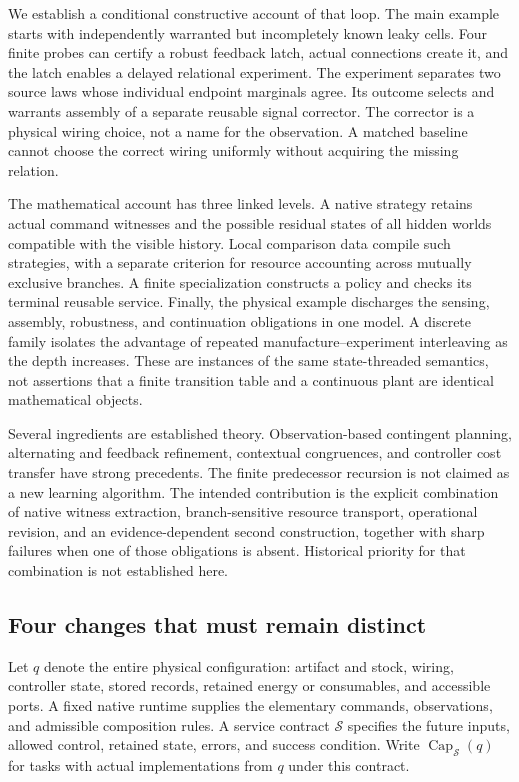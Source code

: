 \documentclass[11pt]{article}
\theoremstyle{definition}
\theoremstyle{remark}
\begin{document}
We establish a conditional constructive account of that loop. The main
example starts with independently warranted but incompletely known leaky
cells. Four finite probes can certify a robust feedback latch, actual
connections create it, and the latch enables a delayed relational
experiment. The experiment separates two source laws whose individual
endpoint marginals agree. Its outcome selects and warrants assembly of a
separate reusable signal corrector. The corrector is a physical wiring
choice, not a name for the observation. A matched baseline cannot choose
the correct wiring uniformly without acquiring the missing relation.

The mathematical account has three linked levels. A native strategy
retains actual command witnesses and the possible residual states of all
hidden worlds compatible with the visible history. Local comparison data
compile such strategies, with a separate criterion for resource
accounting across mutually exclusive branches. A finite specialization
constructs a policy and checks its terminal reusable service. Finally,
the physical example discharges the sensing, assembly, robustness, and
continuation obligations in one model. A discrete family isolates the
advantage of repeated manufacture--experiment interleaving as the depth
increases. These are instances of the same state-threaded semantics,
not assertions that a finite transition table and a continuous plant
are identical mathematical objects.

Several ingredients are established theory. Observation-based contingent
planning, alternating and feedback refinement, contextual congruences,
and controller cost transfer have strong precedents. The finite
predecessor recursion is not claimed as a new learning algorithm. The
intended contribution is the explicit combination of native witness
extraction, branch-sensitive resource transport, operational revision,
and an evidence-dependent second construction, together with sharp
failures when one of those obligations is absent. Historical priority
for that combination is not established here.

\subsection{Four changes that must remain distinct}
Let $q$ denote the entire physical configuration: artifact and stock,
wiring, controller state, stored records, retained energy or consumables,
and accessible ports. A fixed native runtime supplies the elementary
commands, observations, and admissible composition rules. A service
contract $\mathcal S$ specifies the future inputs, allowed control,
retained state, errors, and success condition. Write
$\operatorname{Cap}_{\mathcal S}(q)$ for tasks with actual implementations
from $q$ under this contract.
\end{document}
